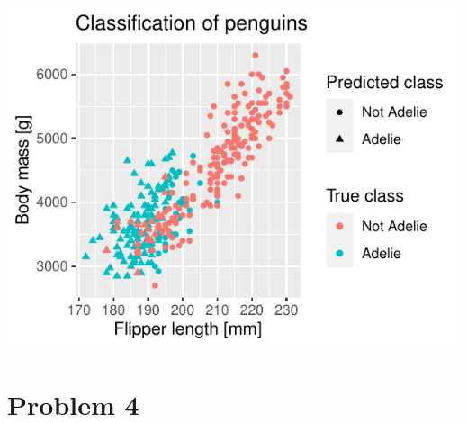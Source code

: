 \documentclass[
]{article}
\begin{document}
\begin{center}\includegraphics{hand-in_files/figure-latex/unnamed-chunk-11-1} \end{center}

\hypertarget{problem-4}{%
\section{Problem 4}\label{problem-4}}
\end{document}
